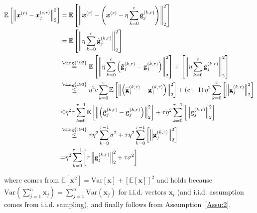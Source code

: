 \begin{align}
 \mathbb{E}\left[\left\|\boldsymbol{x}^{(r)}-\boldsymbol{x}_j^{(c,r)}\right\|_2^2\right]&=\mathbb{E}\left[\left\|\boldsymbol{x}^{(r)}-\left(\boldsymbol{x}^{(r)}-\eta\sum_{k=0}^{c}\tilde{\mathbf{g}}_j^{(k,r)}\right)\right\|_2^2\right]\nonumber\\
 &=\mathbb{E}\left[\left\|\eta\sum_{k=0}^{c}\tilde{\mathbf{g}}_j^{(k,r)}\right\|_2^2\right]\nonumber\\
 &\stackrel{\text{\ding{192}}}{=}\mathbb{E}\left[\left\|\eta\sum_{k=0}^{c}\left(\tilde{\mathbf{g}}_j^{(k,r)}-{\mathbf{g}}_j^{(k,r)}\right)\right\|_2^2\right]+\left[\left\|\eta\sum_{k=0}^{c}{\mathbf{g}}_j^{(k,r)}\right\|_2^2\right]\nonumber\\
 &\stackrel{\text{\ding{193}}}{\leq}\eta^2c\sum_{k=0}^{c}\mathbb{E}\left[\left\|\left(\tilde{\mathbf{g}}_j^{(k,r)}-{\mathbf{g}}_j^{(k,r)}\right)\right\|_2^2\right]+\left(c+1\right)\eta^2\sum_{k=0}^{c}\left[\left\|{\mathbf{g}}_j^{(k,r)}\right\|_2^2\right]\nonumber\\
  &{\leq}\eta^2\tau\sum_{k=0}^{\tau-1}\mathbb{E}\left[\left\|\left(\tilde{\mathbf{g}}_j^{(k,r)}-{\mathbf{g}}_j^{(k,r)}\right)\right\|_2^2\right]+\tau\eta^2\sum_{k=0}^{\tau-1}\left[\left\|{\mathbf{g}}_j^{(k,r)}\right\|_2^2\right]\nonumber\\
  &\stackrel{\text{\ding{194}}}{\leq}\tau\eta^2\sum_{k=0}^{\tau-1}\sigma^2+\tau\eta^2\sum_{k=0}^{\tau-1}\left[\left\|{\mathbf{g}}_j^{(k,r)}\right\|_2^2\right]\nonumber\\
 &{=}\eta^2\sum_{k=0}^{\tau-1}\left[\tau\left\|{\mathbf{g}}_j^{(k,r)}\right\|_2^2+\tau\sigma^2\right]
\end{align}

where  comes from $\mathbb{E}\left[\mathbf{x}^2\right]=\text{Var}\left[\mathbf{x}\right]+\left[\mathbb{E}\left[\mathbf{x}\right]\right]^2$ and  holds because $\text{Var}\left(\sum_{j=1}^n\mathbf{x}_j\right)=\sum_{j=1}^n\text{Var}\left(\mathbf{x}_j\right)$ for i.i.d. vectors $\mathbf{x}_i$ (and i.i.d. assumption comes from i.i.d. sampling), and finally  follows from Assumption~\ref{Assu:2}.

